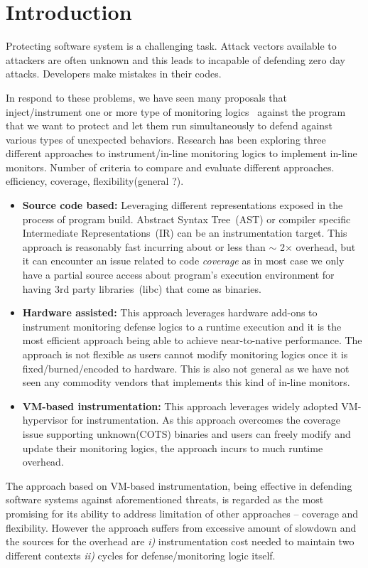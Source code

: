 \section{Introduction} 
\label{sec:intro}

Protecting software system is a challenging task. 
%
Attack vectors available to attackers are often unknown and this leads to
incapable of defending zero day attacks.
%
Developers make mistakes in their codes.

%
In respond to these problems, we have seen many proposals that
inject/instrument one or more type of monitoring logics~\cite{cfi, memcheck,
dft} against the program that we want to protect and let them run
simultaneously to defend against various types of unexpected behaviors.
%
Research has been exploring three different approaches to instrument/in-line
monitoring logics to implement in-line monitors.
%
Number of criteria to compare and evaluate different approaches. efficiency,
coverage, flexibility(general ?).

\begin{itemize}
%
    \item {\bf Source code based:} Leveraging different representations exposed
in the process of program build. Abstract Syntax Tree~(AST) or compiler
specific Intermediate Representations~(IR) can be an instrumentation target.
This approach is reasonably fast incurring about or less than $\sim$ 2$\times$
overhead, but it can encounter an issue related to code {\it coverage} as in
most case we only have a partial source access about program's execution
environment for having 3rd party libraries~(\ie libc) that come as binaries.
%
    \item {\bf Hardware assisted:} This approach leverages hardware add-ons to
instrument monitoring defense logics to a runtime execution and it is the most
efficient approach being able to achieve near-to-native performance. The
approach is not flexible as users cannot modify monitoring logics once it is
fixed/burned/encoded to hardware. This is also not general as we have not seen
any commodity vendors that implements this kind of in-line monitors.
%
    \item {\bf VM-based instrumentation:}  This approach leverages widely
adopted VM-hypervisor for instrumentation. As this approach overcomes the
coverage issue supporting unknown(COTS) binaries and users can freely modify
and update their monitoring logics, the approach incurs to much runtime
overhead.

\end{itemize}
%
The approach based on VM-based instrumentation, being effective in defending
software systems against aforementioned threats, is regarded as the most
promising for its ability to address limitation of other approaches -- coverage
and flexibility. 
%
However the approach suffers from excessive amount of slowdown and the sources
for the overhead are {\it i)} instrumentation cost needed to maintain two
different contexts {\it ii)} cycles for defense/monitoring logic itself.
%

